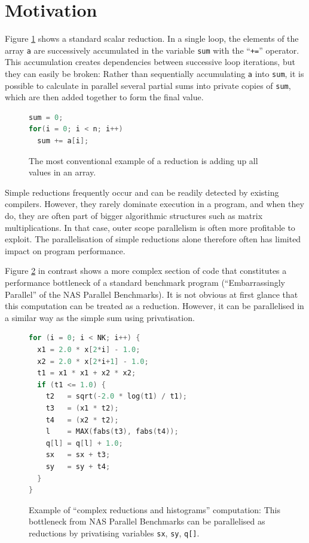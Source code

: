 \section{Motivation}

    Figure \ref{sum-figure} shows a standard scalar reduction.
    In a single loop, the elements of the array \texttt{a} are successively
    accumulated in the variable \texttt{sum} with the ``\texttt{+=}'' operator.
    This accumulation creates dependencies between successive loop iterations,
    but they can easily be broken:
    Rather than sequentially accumulating {\tt a} into {\tt sum}, it is possible
    to calculate in parallel several partial sums into private copies of
    \texttt{sum}, which are then added together to form the final value.

\begin{figure}[h]
\begin{lstlisting}[language=C++]
sum = 0;
for(i = 0; i < n; i++)
  sum += a[i];
\end{lstlisting}
\caption{The most conventional example of a reduction is adding up all values in
         an array. \parfillskip=0pt}
\label{sum-figure}
\end{figure}

    Simple reductions frequently occur and can be readily detected by existing
    compilers.
    However, they rarely dominate execution in a program, and when they do, they
    are often part of bigger algorithmic structures such as matrix
    multiplications.
    In that case, outer scope parallelism is often more profitable to exploit.
    The parallelisation of simple reductions alone therefore often has limited
    impact on program performance.

    Figure \ref{complex-reduction-figure} in contrast shows a more complex
    section of code that constitutes a performance bottleneck of a standard
    benchmark program
    (``Embarrassingly Parallel'' of the NAS Parallel Benchmarks).
    It is not obvious at first glance that this computation can be treated as a
    reduction.
    However, it can be parallelised in a similar way as the simple sum using
    privatisation.

\begin{figure}[h]
\begin{lstlisting}[language=C++]
for (i = 0; i < NK; i++) {
  x1 = 2.0 * x[2*i] - 1.0;
  x2 = 2.0 * x[2*i+1] - 1.0;
  t1 = x1 * x1 + x2 * x2;
  if (t1 <= 1.0) {
    t2   = sqrt(-2.0 * log(t1) / t1);
    t3   = (x1 * t2);
    t4   = (x2 * t2);
    l    = MAX(fabs(t3), fabs(t4));
    q[l] = q[l] + 1.0;
    sx   = sx + t3;
    sy   = sy + t4;
  }
}
\end{lstlisting}
\caption{Example of ``complex reductions and histograms'' computation:
         This bottleneck from NAS Parallel Benchmarks can be parallelised
         as reductions by privatising variables \texttt{sx}, \texttt{sy},
         \texttt{q[]}.\parfillskip=0pt}
\label{complex-reduction-figure}
\end{figure}

